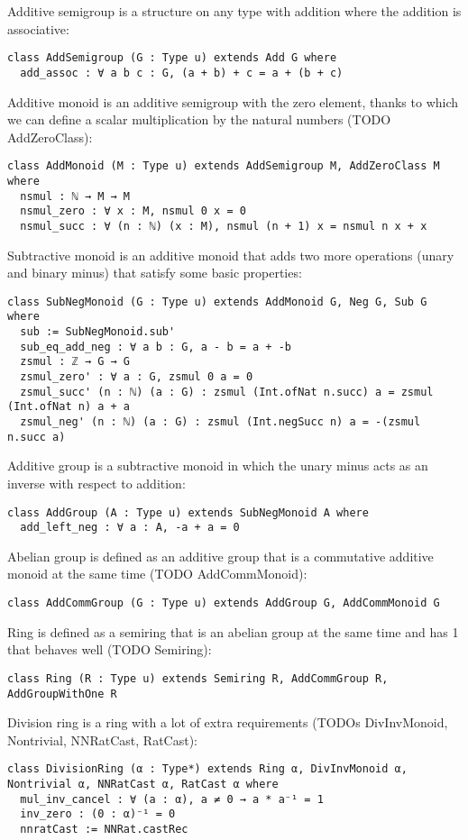 \documentclass[]{article}
\renewcommand{\.}{\hskip .75pt}
\begin{document}
Additive semigroup is a structure on any type with addition where the addition is associative:
\begin{lstlisting}
class AddSemigroup (G : Type u) extends Add G where
  add_assoc : ∀ a b c : G, (a + b) + c = a + (b + c)
\end{lstlisting}
Additive monoid is an additive semigroup with the zero element, thanks to which we can
define a scalar multiplication by the natural numbers (TODO AddZeroClass):
\begin{lstlisting}
class AddMonoid (M : Type u) extends AddSemigroup M, AddZeroClass M where
  nsmul : ℕ → M → M
  nsmul_zero : ∀ x : M, nsmul 0 x = 0 
  nsmul_succ : ∀ (n : ℕ) (x : M), nsmul (n + 1) x = nsmul n x + x 
\end{lstlisting}
Subtractive monoid is an additive monoid that adds two more operations (unary and binary minus)
that satisfy some basic properties:
\begin{lstlisting}
class SubNegMonoid (G : Type u) extends AddMonoid G, Neg G, Sub G where
  sub := SubNegMonoid.sub'
  sub_eq_add_neg : ∀ a b : G, a - b = a + -b 
  zsmul : ℤ → G → G
  zsmul_zero' : ∀ a : G, zsmul 0 a = 0 
  zsmul_succ' (n : ℕ) (a : G) : zsmul (Int.ofNat n.succ) a = zsmul (Int.ofNat n) a + a
  zsmul_neg' (n : ℕ) (a : G) : zsmul (Int.negSucc n) a = -(zsmul n.succ a)
\end{lstlisting}
Additive group is a subtractive monoid in which the unary minus acts as an inverse with respect to addition:
\begin{lstlisting}
class AddGroup (A : Type u) extends SubNegMonoid A where
  add_left_neg : ∀ a : A, -a + a = 0
\end{lstlisting}
Abelian group is defined as an additive group that is a commutative additive monoid at the same time (TODO AddCommMonoid):
\begin{lstlisting}
class AddCommGroup (G : Type u) extends AddGroup G, AddCommMonoid G
\end{lstlisting}
Ring is defined as a semiring that is an abelian group at the same time and has 1 that behaves well (TODO Semiring):
\begin{lstlisting}
class Ring (R : Type u) extends Semiring R, AddCommGroup R, AddGroupWithOne R
\end{lstlisting}
Division ring is a ring with a lot of extra requirements (TODOs DivInvMonoid, Nontrivial, NNRatCast, RatCast):
\begin{lstlisting}
class DivisionRing (α : Type*) extends Ring α, DivInvMonoid α, Nontrivial α, NNRatCast α, RatCast α where
  mul_inv_cancel : ∀ (a : α), a ≠ 0 → a * a⁻¹ = 1
  inv_zero : (0 : α)⁻¹ = 0
  nnratCast := NNRat.castRec
\end{lstlisting}
\end{document}
